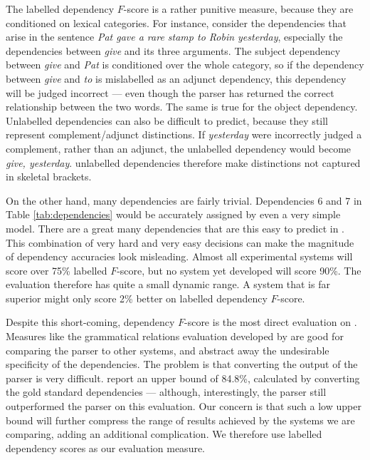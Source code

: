 The labelled dependency $F$-score is a rather punitive measure, because they are
conditioned on lexical categories. For instance, consider the dependencies that
arise in the sentence \emph{Pat gave a rare stamp to Robin yesterday},
especially the dependencies between \emph{give} and its three arguments. The
subject dependency between \emph{give} and \emph{Pat} is conditioned over the
whole category, so if the dependency between \emph{give} and \emph{to} is
mislabelled as an adjunct dependency, this dependency will be judged incorrect
--- even though the parser has returned the correct relationship between the two
words. The same is true for the object dependency. Unlabelled dependencies can
also be difficult to predict, because they still represent complement/adjunct
distinctions. If \emph{yesterday} were incorrectly judged a complement, rather
than an adjunct, the unlabelled dependency would become \emph{give, yesterday}.
\ccg unlabelled dependencies therefore make distinctions not captured in \penn
skeletal brackets.

On the other hand, many dependencies are fairly trivial. Dependencies 6 and 7 in
Table \ref{tab:dependencies} would be accurately assigned by even a very simple
model. There are a great many dependencies that are this easy to predict in
\ccgbank. This combination of very hard and very easy decisions can make the
magnitude of dependency accuracies look misleading. Almost all experimental
systems will score over 75\% labelled $F$-score, but no system yet developed
will score 90\%. The evaluation therefore has quite a small dynamic range. A
system that is far superior might only score 2\% better on labelled dependency
$F$-score.

Despite this short-coming, dependency $F$-score is the most direct evaluation on
\ccgbank. Measures like the grammatical relations evaluation developed by
\citet{briscoe:poster06} are good for comparing the parser to other systems, and
abstract away the undesirable specificity of the \ccg dependencies. The problem
is that converting the output of the parser is very difficult.
\citet{clark:acl07parseval} report an upper bound of 84.8\%, calculated by
converting the gold standard \ccgbank dependencies --- although, interestingly,
the \candc parser still outperformed the \rasp parser on this evaluation. Our
concern is that such a low upper bound will further compress the range of
results achieved by the systems we are comparing, adding an additional
complication. We therefore use labelled dependency scores as our evaluation
measure.

